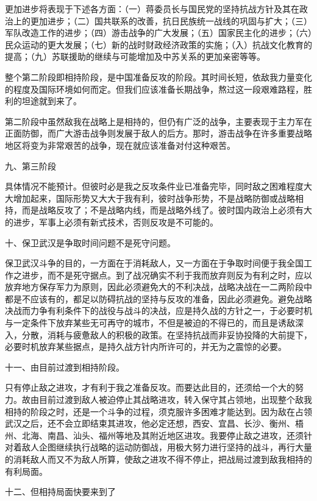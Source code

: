 更加进步将表现于下述各方面：（一）蒋委员长与国民党的坚持抗战方针及其在政治上的更加进步；（二）国共联系的改善，抗日民族统一战线的巩固与扩大；（三）军队改造工作的进步；（四）游击战争的广大发展；（五）国家民主化的进步；（六）民众运动的更大发展；（七）新的战时财政经济政策的实施；（入）抗战文化教育的提高；（九）苏联援助的继续与可能增加及中苏关系的更加亲密等等。

整个第二阶段即相持阶段，是中国准备反攻的阶段。其时间长短，依敌我力量变化的程度及国际环境如何而定。但我们应该准备长期战争，熬过这一段艰难路程，胜利的坦途就到来了。

第二阶段中虽然敌我在战略上是相持的，但仍有广泛的战争，主要表现于主力军在正面防御，而广大游击战争则发展于敌人的后方。那时，游击战争在许多重要战略地区将变为非常艰苦的战争，现在就应该准备对付这种艰苦。

九、第三阶段

具体情况不能预计。但彼时必是我之反攻条件业已准备完毕，同时敌之困难程度大大增加起来，国际形势又大大于我有利，彼时战争形势，不是战略防御或战略相持，而是战略反攻了；不是战略内线，而是战略外线了。彼时国内政治上必须有大的进步，军事上必须有新式技术，否则反攻是不可能的。

十、保卫武汉是争取时间问题不是死守问题。

保卫武汉斗争的目的，一方面在于消耗敌人，又一方面在于争取时间便于我全国工作之进步，而不是死守据点。到了战况确实不利于我而放弃则反为有利之时，应以放弃地方保存军力为原则，因此必须避免大的不利决战，战略决战在一二两阶段中都是不应该有的，都足以防碍抗战的坚持与反攻的准备，因此必须避免。避免战略决战而力争有利条件下的战役与战斗的决战，应是持久战的方针之一，于必要时机与一定条件下放弃某些无可再守的城市，不但是被迫的不得已的，而且是诱敌深入，分散，消耗与疲惫敌人的积极的政策。在坚持抗战而非妥协投降的大前提下，必要时机放弃某些据点，是持久战方针内所许可的，并无为之震惊的必要。

十一、由目前过渡到相持阶段。

只有停止敌之进攻，才有利于我之准备反攻。而要达此目的，还须给一个大的努力。故由目前过渡到敌人被迫停止其战略进攻，转入保守其占领地，出现整个敌我相持的阶段之时，还是一个斗争的过程，须克服许多困难才能达到。因为敌在占领武汉之后，还不会立即结束其进攻，他必定还想，西安、宜昌、长沙、衡州、梧州、北海、南昌、汕头、福州等地及其附近地区进攻。我要停止敌之进攻，还须针对着敌人企图继续执行战略的运动防御战，用极大努力进行坚持的战斗，再行大量的消耗敌人而又不为敌人所算，使敌之进攻不得不停止，把战局过渡到敌我相持的有利局面。

十二、但相持局面快要来到了

